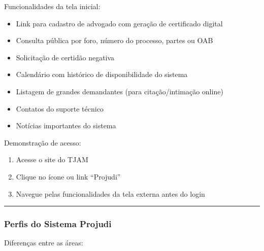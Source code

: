 \documentclass[letterpaper,10pt,brazil]{sphinxmanual}
\begin{document}
\sphinxAtStartPar
Funcionalidades da tela inicial:
\begin{itemize}
\item {} 
\sphinxAtStartPar
Link para cadastro de advogado com geração de certificado digital

\item {} 
\sphinxAtStartPar
Consulta pública por foro, número do processo, partes ou OAB

\item {} 
\sphinxAtStartPar
Solicitação de certidão negativa

\item {} 
\sphinxAtStartPar
Calendário com histórico de disponibilidade do sistema

\item {} 
\sphinxAtStartPar
Listagem de grandes demandantes (para citação/intimação online)

\item {} 
\sphinxAtStartPar
Contatos do suporte técnico

\item {} 
\sphinxAtStartPar
Notícias importantes do sistema

\end{itemize}

\sphinxAtStartPar
Demonstração de acesso:
\begin{enumerate}
%
\item {} 
\sphinxAtStartPar
Acesse o site do TJAM

\item {} 
\sphinxAtStartPar
Clique no ícone ou link “Projudi”

\item {} 
\sphinxAtStartPar
Navegue pelas funcionalidades da tela externa antes do login

\end{enumerate}


\bigskip\hrule\bigskip



\subsubsection{Perfis do Sistema Projudi}
\label{\detokenize{projud_01_visaogeral:perfis-do-sistema-projudi}}
\sphinxAtStartPar
Diferenças entre as áreas:
\end{document}
